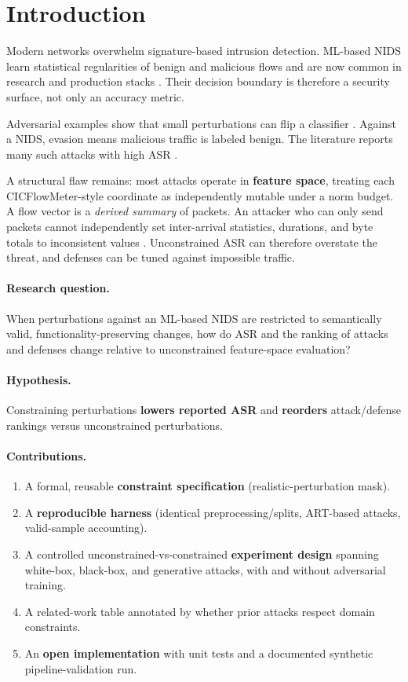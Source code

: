 \documentclass[11pt,a4paper]{article}
\begin{document}
\section{Introduction}

Modern networks overwhelm signature-based intrusion detection. ML-based NIDS learn statistical regularities of benign and malicious flows and are now common in research and production stacks \cite{he2023aml}. Their decision boundary is therefore a security surface, not only an accuracy metric.

Adversarial examples show that small perturbations can flip a classifier \cite{goodfellow2015explaining,madry2018towards}. Against a NIDS, evasion means malicious traffic is labeled benign. The literature reports many such attacks with high ASR \cite{he2023aml,sharma2024systematic}.

A structural flaw remains: most attacks operate in \textbf{feature space}, treating each CICFlowMeter-style coordinate as independently mutable under a norm budget. A flow vector is a \emph{derived summary} of packets. An attacker who can only send packets cannot independently set inter-arrival statistics, durations, and byte totals to inconsistent values \cite{alhussien2024constraining,ennaji2024adversarial}. Unconstrained ASR can therefore overstate the threat, and defenses can be tuned against impossible traffic.

\paragraph{Research question.}
When perturbations against an ML-based NIDS are restricted to semantically valid, functionality-preserving changes, how do ASR and the ranking of attacks and defenses change relative to unconstrained feature-space evaluation?

\paragraph{Hypothesis.}
Constraining perturbations \textbf{lowers reported ASR} and \textbf{reorders} attack/defense rankings versus unconstrained perturbations.

\paragraph{Contributions.}
\begin{enumerate}
\item A formal, reusable \textbf{constraint specification} (realistic-perturbation mask).
\item A \textbf{reproducible harness} (identical preprocessing/splits, ART-based attacks, valid-sample accounting).
\item A controlled unconstrained-vs-constrained \textbf{experiment design} spanning white-box, black-box, and generative attacks, with and without adversarial training.
\item A related-work table annotated by whether prior attacks respect domain constraints.
\item An \textbf{open implementation} with unit tests and a documented synthetic pipeline-validation run.
\end{enumerate}
\end{document}

